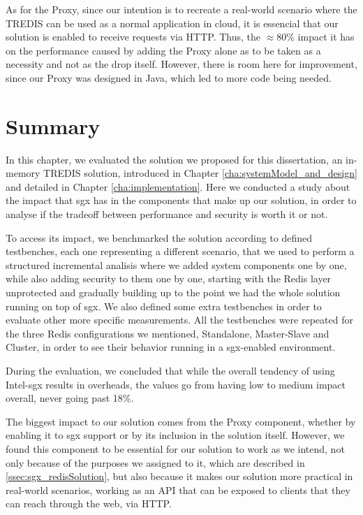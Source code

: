 As for the Proxy, since our intention is to recreate a real-world scenario where the TREDIS can be used as a normal application in cloud, it is essencial that our solution is enabled to receive requests via HTTP. Thus, the $\approx$80\% impact it has on the performance caused by adding the Proxy alone as to be taken as a necessity and not as the drop itself. However, there is room here for improvement, since our Proxy was designed in Java, which led to more code being needed. 

\section{Summary}

In this chapter, we evaluated the solution we proposed for this dissertation, an in-memory TREDIS solution, introduced in Chapter \ref{cha:systemModel_and_design} and detailed in Chapter \ref{cha:implementation}. Here we conducted a study about the impact that \gls{sgx} has in the components that make up our solution, in order to analyse if the tradeoff between performance and security is worth it or not. 

To access its impact, we benchmarked the solution according to defined testbenches, each one representing a different scenario, that we used to perform a structured incremental analisis where we added system components one by one, while also adding security to them one by one, starting with the Redis layer unprotected and gradually building up to the point we had the whole solution running on top of \gls{sgx}. We also defined some extra testbenches in order to evaluate other more specific measurements. All the testbenches were repeated for the three Redis configurations we mentioned, Standalone, Master-Slave and Cluster, in order to see their behavior running in a \gls{sgx}-enabled environment.

During the evaluation, we concluded that while the overall tendency of using Intel-\gls{sgx} results in overheads, the values go from having low to medium impact overall, never going past 18\%. 

The biggest impact to our solution comes from the Proxy component, whether by enabling it to \gls{sgx} support or by its inclusion in the solution itself. However, we found this component to be essential for our solution to work as we intend, not only because of the purposes we assigned to it, which are described in \ref{ssec:sgx_redisSolution}, but also because it makes our solution more practical in real-world scenarios, working as an API that can be exposed to clients that they can reach through the web, via HTTP.

